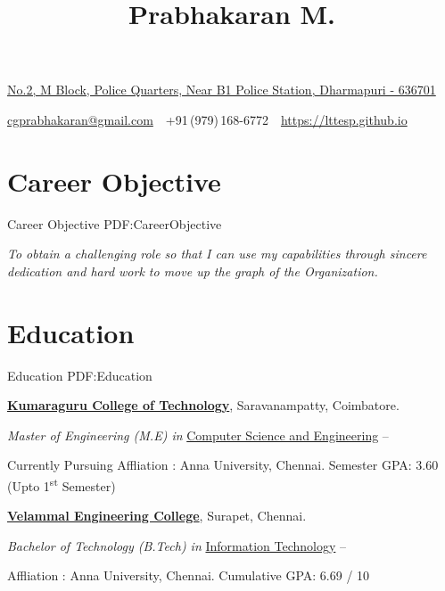 \documentclass[letterpaper,MMMyyyy,nonstop]{simpleresumecv}
\newcommand{\CVAuthor}{Prabhakaran M.}
\newcommand{\CVWebpage}{https://lttesp.github.io}
\begin{document}

\title{\CVAuthor}

\begin{subtitle}
\href{https://www.google.co.in/maps/place/B1+Town+Police+Station/@12.1289065,78.1592938,19z/data=!4m2!3m1!1s0x3bac16fdb579ea7b:0xece4708cacc17e9a}
{No.2, M Block, Police Quarters, Near B1 Police Station, Dharmapuri - 636701}
\par
\href{mailto:cgprabhakaran@gmail.com}
{cgprabhakaran@gmail.com}
\,\SubBulletSymbol\,
+91\,(979)\,168-6772
\,\SubBulletSymbol\,
\href{\CVWebpage}
{\CVWebpage}
\end{subtitle}

\begin{body}


\section
{Career Objective}
{Career Objective}
{PDF:CareerObjective}

\emph{To obtain a challenging role so that I can use my capabilities through sincere dedication and hard work to move up the graph of the Organization.}



\section
{Education}
{Education}
{PDF:Education}

\href{http://www.kct.ac.in}
{\textbf{Kumaraguru College of Technology}},
Saravanampatty, Coimbatore.

\GapNoBreak
\BulletItem
\emph {Master of Engineering (M.E) in}
\href{http://kct.ac.in/cse.html}
{{Computer Science and Engineering}}
\hfill
{} --
\begin{detail}
\SubBulletItem 
Currently Pursuing
\SubBulletItem 
Affliation : Anna University, Chennai.
\SubBulletItem
Semester GPA: 3.60 (Upto 1\textsuperscript{st} Semester)
\end{detail}
\BigGap

\href{http://www.velammal.edu.in}
{\textbf{Velammal Engineering College}},
Surapet, Chennai.

\GapNoBreak
\BulletItem
\emph {Bachelor of Technology (B.Tech) in}
\href{velammal.edu.in/ITnew_aboutdep.html}
{{Information Technology}}
\hfill
{} --
\begin{detail}
\SubBulletItem 
Affliation : Anna University, Chennai.
\SubBulletItem
Cumulative GPA: 6.69 / 10
\end{detail}


\end{body}
\end{document}

